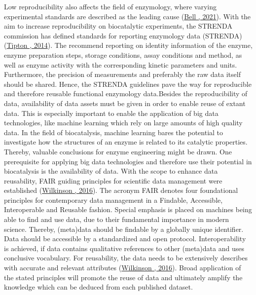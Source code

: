 \documentclass[letterpaper,12pt,english]{jupyterBook}
\begin{document}
\sphinxAtStartPar
Low reproducibility also affects the field of enzymology, where varying experimental standards are described as the leading cause (\hyperlink{cite.references:id42}{Bell , 2021}). With the aim to increase reproducibility on biocatalytic experiments, the STRENDA commission has defined standards for reporting enzymology data (STRENDA) (\hyperlink{cite.references:id11}{Tipton , 2014}). The  recommend reporting on identity information of the enzyme, enzyme preparation steps, storage conditions, assay conditions and method, as well as enzyme activity with the corresponding kinetic parameters and units. Furthermore, the precision of measurements and preferably the raw data itself should be shared. Hence, the STRENDA guidelines pave the way for reproducible and therefore reusable functional enzymology data.Besides the reproducibility of data, availability of data assets must be given in order to enable reuse of extant data. This is especially important to enable the application of big data technologies, like machine learning which rely on large amounts of high quality data. In the field of biocatalysis, machine learning bares the potential to investigate how the structures of an enzyme is related to its catalytic properties. Thereby, valuable conclusions for enzyme engineering might be drawn.
One prerequisite for applying big data technologies and therefore use their potential in biocatalysis is the availability of data. With the scope to enhance data reusability, FAIR guiding principles for scientific data management were established (\hyperlink{cite.references:id40}{Wilkinson , 2016}). The acronym FAIR denotes four foundational principles for contemporary data management in a Findable, Accessible, Interoperable and Reusable fashion. Special emphasis is placed on machines being able to find and use data, due to their fundamental importance in modern science. Thereby, (meta)data should be findable by a globally unique identifier. Data should be accessible by a standardized and open protocol. Interoperability is achieved, if data contains qualitative references to other (meta)data and uses conclusive vocabulary. For reusability, the data needs to be extensively describes with accurate and relevant attributes (\hyperlink{cite.references:id40}{Wilkinson , 2016}). Broad application of the stated principles will promote the reuse of data and ultimately amplify the knowledge which can be deduced from each published dataset.
\end{document}
